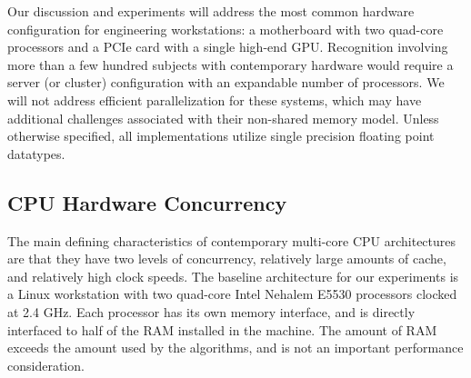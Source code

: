 Our discussion and experiments will address the most common hardware
configuration for engineering workstations: a motherboard with two quad-core
processors and a PCIe card with a single high-end GPU.  
Recognition involving more than a few hundred subjects with contemporary hardware
would require a server (or cluster) configuration with an expandable 
number of processors.  We will not address efficient parallelization for 
these systems, which may have additional challenges associated with
their non-shared memory model.
Unless otherwise specified, all implementations utilize single precision
floating point datatypes.  

\subsection{CPU Hardware Concurrency}
\label{sec:CPU-concurrency}
The main defining characteristics of contemporary multi-core CPU architectures
are that they have two levels of concurrency, relatively large amounts of
cache, and relatively high clock speeds. The baseline architecture for our experiments 
is a Linux workstation with two
quad-core Intel Nehalem E5530 processors clocked at 2.4 GHz.  Each processor
has its own memory interface, and is directly interfaced to half of the RAM
installed in the machine.  The amount of RAM exceeds the amount used
by the algorithms, and is not an important performance consideration.  

